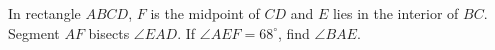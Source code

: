 In rectangle $ABCD$, $F$ is the midpoint of $CD$ and $E$ lies in the interior of $BC$. Segment $AF$ bisects $\angle EAD$. If $\angle AEF=68^\circ$, find $\angle BAE$.
